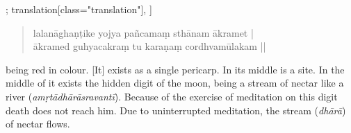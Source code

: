 \begin{alignment}[
    texts=edition[class="edition"];
    translation[class="translation"],
 ]
\begin{translation}
\begin{tlate}
{\begin{quote}
    lalanāghaṇṭike yojya pañcamaṃ sthānam ākramet |\\
    ākramed guhyacakraṃ tu karaṇaṃ cordhvamūlakam ||
  \end{quote}} being red in colour. [It] exists as a single pericarp. In its middle is a site.\textsuperscript{\coro{[\lowroman{5}]}} In the middle of it exists the hidden digit of the moon, being a stream of nectar like a river (\textit{amṛtādhārāsravantī}). Because of the exercise of meditation on this digit death does not reach him. Due to uninterrupted meditation, the stream (\textit{dhārā}) of nectar flows. \vspace*{\fill} 
    \end{tlate}
  \end{translation}
  \ekdpb*{}
\end{alignment}
